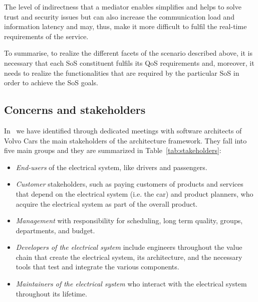 The level of indirectness that a mediator enables simplifies and helps to solve trust and security issues but can also increase the communication load and information latency and may, thus, make it more difficult to fulfil the real-time requirements of the service.

To summarise, to realize the different facets of the scenario described above, it is necessary that each SoS constituent fulfils its QoS requirements and, moreover, it needs to realize the functionalities that are required by the particular SoS in order to achieve the SoS goals.

\subsection{Concerns and stakeholders}

In~\cite{JSA2017} we have identified through dedicated meetings with software architects of Volvo Cars the main stakeholders of the architecture framework. They fall into five main groups and they are summarized in Table~\ref{tab:stakeholders}: 

\begin{itemize}
\item \emph{End-users} of the electrical system, like drivers and passengers.
\item \emph{Customer} stakeholders, such as paying customers of products and services that depend on the electrical system (i.e. the car) and product planners, who acquire the electrical system as part of the overall product.
\item \emph{Management} with responsibility for scheduling, long term quality, groups, departments, and budget.
\item \emph{Developers of the electrical system}  include engineers throughout the value chain that create the electrical system, its architecture, and the necessary tools  that test and integrate the various components. 
\item \emph{Maintainers of the electrical system} who interact with the electrical system throughout its lifetime. 
\end{itemize}

